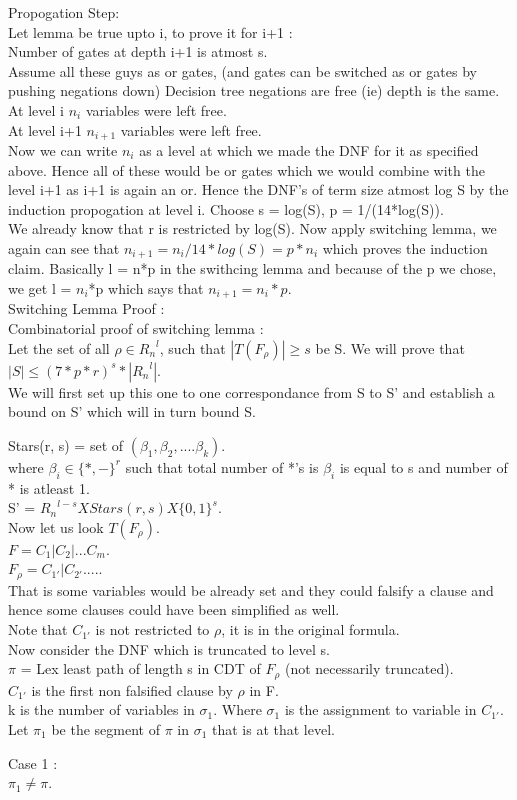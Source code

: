 \documentclass[solution,addpoints,12pt]{exam}
\begin{document}
Propogation Step:\\
Let lemma be true upto i, to prove it for i+1 :\\
Number of gates at depth i+1 is atmost s.\\
Assume all these guys as or gates, (and gates can be switched
as or gates by pushing negations down) Decision tree negations
are free (ie) depth is the same.
At level i $n_i$ variables were left free.\\
At level i+1 $n_{i+1}$ variables were left free.\\
Now we can write $n_i$ as a level at which we made the DNF for
it as specified above. Hence all of these would be or gates
which we would combine with the level i+1 as i+1
is again an or.
Hence the DNF's of term size atmost log S by the
induction propogation at level i. Choose s = log(S), p = 1/(14*log(S)).\\
We already know that r is restricted by log(S).
Now apply switching lemma, we again can see that
$n_{i+1} = n_i/14*log(S) = p*n_i$ which proves the induction claim.
Basically l = n*p in the swithcing lemma and
because of the p we chose, we get l = $n_i$*p which
says that $n_{i+1} = n_i*p$.\\

Switching Lemma Proof :\\
Combinatorial proof of switching lemma :\\
Let the set of all $\rho \in {R_n}^l$, such
that $|T(F_{\rho})| \ge s$ be S.
We will prove that $|S| \le {(7*p*r)}^s*|{R_n}^l|$.\\
We will first set up this one to one correspondance from
S to S' and establish a bound on S' which will in turn bound S.

Stars(r, s) = set of $(\beta_1, \beta_2, .... \beta_k)$.\\
where $\beta_i \in {\{*, -\}}^{r}$
such that total number of *'s is ${\beta}_i$ is equal to s and
number of * is atleast 1.\\
S' = ${R_n}^{l-s}XStars(r, s)X{\{0, 1\}}^s$.\\
Now let us look $T(F_{\rho})$.\\
$F = C_1 | C_2 | ... C_m$.\\
$F_{\rho} = C_{1'} | C_{2'} ....$.\\
That is some variables would be already set and they could
falsify a clause and hence some clauses could have been simplified as well.\\
Note that $C_{1'}$ is not restricted to $\rho$, it is in the original formula.\\
Now consider the DNF which is truncated to level s.\\
$\pi$ = Lex least path of length s in CDT of $F_{\rho}$ (not necessarily truncated).\\
$C_{1'}$ is the first non falsified clause by $\rho$ in F.\\
k is the number of variables in ${\sigma}_1$. Where ${\sigma}_1$
is the assignment to variable in $C_{1'}$.\\
Let $\pi_1$ be the segment of $\pi$ in $\sigma_1$ that is at that level.

Case 1 :\\
$\pi_1 \ne \pi$.\\
\end{document}
